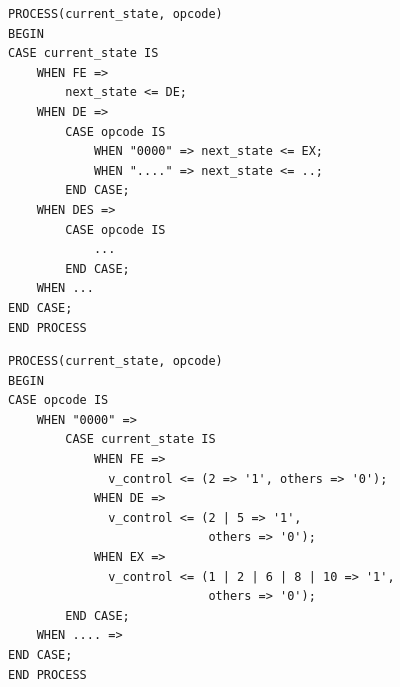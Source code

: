 \documentclass[a4paper,11pt]{article}
\begin{document}
\begin{appendix}
\newpage

\begin{lstlisting}[frame=single]
PROCESS(current_state, opcode)
BEGIN
CASE current_state IS
    WHEN FE =>
        next_state <= DE;
    WHEN DE =>
        CASE opcode IS
            WHEN "0000" => next_state <= EX;
            WHEN "...." => next_state <= ..;
        END CASE;
    WHEN DES =>
        CASE opcode IS
            ...
        END CASE;
    WHEN ...
END CASE;
END PROCESS    
\end{lstlisting}
\vspace{30pt}
\begin{lstlisting}[frame=single]
PROCESS(current_state, opcode)
BEGIN
CASE opcode IS
    WHEN "0000" =>
        CASE current_state IS
            WHEN FE =>
              v_control <= (2 => '1', others => '0');
            WHEN DE =>
              v_control <= (2 | 5 => '1', 
                            others => '0');
            WHEN EX =>
              v_control <= (1 | 2 | 6 | 8 | 10 => '1', 
                            others => '0');
        END CASE;
    WHEN .... =>
END CASE;
END PROCESS    
\end{lstlisting}
\vspace{25pt}

\newpage

\end{appendix}
\end{document}
